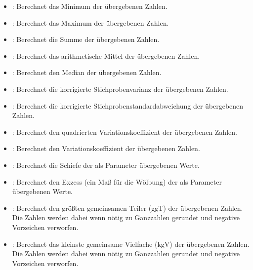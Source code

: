 \begin{itemize}

\item
{}:
Berechnet das Minimum der übergebenen Zahlen.

\item
{}:
Berechnet das Maximum der übergebenen Zahlen.

\item
{}:
Berechnet die Summe der übergebenen Zahlen.

\item
{}:
Berechnet das arithmetische Mittel der übergebenen Zahlen.

\item
{}:
Berechnet den Median der übergebenen Zahlen.

\item
{}:
Berechnet die korrigierte Stichprobenvarianz der übergebenen Zahlen.

\item
{}:
Berechnet die korrigierte Stichprobenstandardabweichung der übergebenen Zahlen.

\item
{}:
Berechnet den quadrierten Variationskoeffizient der übergebenen Zahlen.

\item
{}:
Berechnet den Variationskoeffizient der übergebenen Zahlen.

\item
{}:
Berechnet die Schiefe der als Parameter übergebenen Werte.

\item
{}:
Berechnet den Exzess (ein Maß für die Wölbung) der als Parameter übergebenen Werte.

\item
{}:
Berechnet den größten gemeinsamen Teiler (ggT) der übergebenen Zahlen. Die Zahlen werden dabei wenn nötig zu Ganzzahlen gerundet und negative Vorzeichen verworfen.
\item
{}:
Berechnet das kleinste gemeinsame Vielfache (kgV) der übergebenen Zahlen. Die Zahlen werden dabei wenn nötig zu Ganzzahlen gerundet und negative Vorzeichen verworfen.

\end{itemize}



